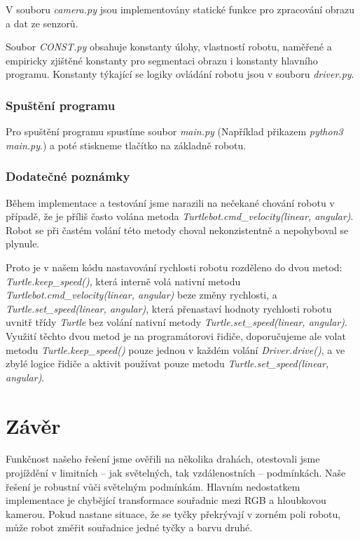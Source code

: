 \documentclass{article}
\begin{document}
	V souboru \emph{camera.py} jsou implementovány statické funkce pro zpracování obrazu a dat ze senzorů.
	
	Soubor \emph{CONST.py} obsahuje konstanty úlohy, vlastností robotu, naměřené a empiricky zjištěné konstanty pro segmentaci obrazu i konstanty hlavního programu. Konstanty týkající se logiky ovládání robotu jsou v souboru \emph{driver.py}.
	
\subsubsection{Spuštění programu}

	Pro spuštění programu spustíme soubor \emph{main.py} (Například přikazem \emph{python3 main.py}.) a poté stiskneme tlačítko  na základně robotu. 

\subsubsection{Dodatečné poznámky}

	Během implementace a testování jsme narazili na nečekané chování robotu v případě, že je příliš často volána metoda \emph{Turtlebot.cmd\_velocity(linear, angular)}. Robot se při častém volání této metody choval nekonzistentně a nepohyboval se plynule.

	Proto je v našem kódu nastavování rychlosti robotu rozděleno do dvou metod: \emph{Turtle.keep\_speed()}, která interně volá nativní metodu \emph{Turtlebot.cmd\_velocity(linear, angular)} beze změny rychlosti, a \emph{Turtle.set\_speed(linear, angular)}, která přenastaví hodnoty rychlosti robotu uvnitř třídy \emph{Turtle} bez volání nativní metody \emph{Turtle.set\_speed(linear, angular)}. Využití těchto dvou metod je na programátorovi řidiče, doporučujeme ale volat metodu \emph{Turtle.keep\_speed()} pouze jednou v každém volání \emph{Driver.drive()}, a ve zbylé logice řidiče a aktivit používat pouze metodu \emph{Turtle.set\_speed(linear, angular)}.

\newpage

\section{Závěr}
 	
 	Funkčnost našeho řešení jsme ověřili na několika drahách, otestovali jsme projíždění v limitních -- jak světelných, tak vzdálenostních -- podmínkách. Naše řešení je robustní vůči světelným podmínkám. Hlavním nedostatkem implementace je chybějící transformace souřadnic mezi RGB a hloubkovou kamerou. Pokud nastane situace, že se tyčky překrývají v zorném poli robotu, může robot změřit souřadnice jedné tyčky a barvu druhé. 
 	
\end{document}
